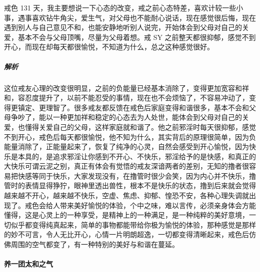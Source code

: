 \begin{case}
    戒色 131 天，我主要想说一下心态的改变，戒之前心态特差，喜欢计较一些小事，遇事喜欢钻牛角尖，爱生气，对父母也不能耐心说话，现在感觉很后悔，现在遇到别人与自己意见不和，也能安静地听别人说完，开始体会到父母对自己的关爱，基本不会与父母顶嘴，尽量为父母着想。戒 SY 之前整天都很抑郁，感觉不到开心，而现在却每天都很愉悦，不知道为什么，总之这种感觉很好。
    \subparagraph{解析} 这位戒友心理的改变很明显，之前的负能量已经基本消除了，变得更加宽容和祥和，容忍度提升了，以前不能忍受的事情，现在也不会烦恼了，不容易冲动了，变得更镇定、更理智了。很多戒友都反馈在戒色后家庭变得和谐很多，基本不会和父母争吵了，能以一种更加祥和稳定的心态去为人处世，能体会到父母对自己的关爱，也懂得关爱自己的父母，这样家庭就和谐了。他之前邪淫时每天很抑郁，感觉不到开心，戒色后每天都很愉悦，他不知为什么，其实背后的原理很简单，因为负能量消除了，正能量起来了，恢复了纯净的心灵，自然会感受到开心愉悦，因为快乐是本具的，是追求邪淫让你感到不开心、不快乐，邪淫给予的是快感，和真正的大快乐可谓云泥之别，真正有体会有觉悟的戒友深谙两者的差别，无知的撸者很容易把快感等同于快乐，大家发现没有，在撸管时很少会笑，因为内心并不快乐，撸管时的表情显得狰狞，眼神里透出兽性，根本不是快乐的状态，撸到后来就会觉得越来越不开心，越来越不快乐，空虚、焦虑、抑郁、惶恐不安，各种心理失调就出现了。戒色会给人带来美好愉悦的体验，个中之味，难以言传，必须亲身体会方能懂得，这是心灵上的一种享受，是精神上的一种满足，是一种纯粹的美好意境，一切似乎都变得纯真起来，简单的事物都能带给你极为愉悦的体验，那种感觉是那样的妙不可言，令人无比开心，心情一片明朗超逸，一切都变得清晰起来，戒色后仿佛周围的空气都变了，有一种特别的美好与和谐在蔓延。
\end{case}

\paragraph{养一团太和之气}

